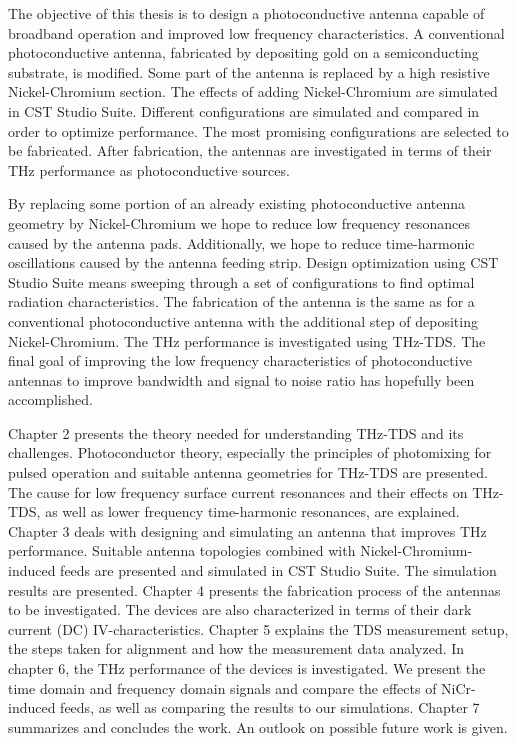 The objective of this thesis is to design a photoconductive antenna capable of broadband operation and improved low frequency characteristics. A conventional photoconductive antenna, fabricated by depositing gold on a semiconducting substrate, is modified. Some part of the antenna is replaced by a high resistive Nickel-Chromium section. The effects of adding Nickel-Chromium are simulated in CST Studio Suite. Different configurations are simulated and compared in order to optimize performance. The most promising configurations are selected to be fabricated. After fabrication, the antennas are investigated in terms of their THz performance as photoconductive sources.

By replacing some portion of an already existing photoconductive antenna geometry by Nickel-Chromium we hope to reduce low frequency resonances caused by the antenna pads. Additionally, we hope to reduce time-harmonic oscillations caused by the antenna feeding strip. Design optimization using CST Studio Suite means sweeping through a set of configurations to find optimal radiation characteristics. The fabrication of the antenna is the same as for a conventional photoconductive antenna with the additional step of depositing Nickel-Chromium. The THz performance is investigated using THz-TDS. The final goal of improving the low frequency characteristics of photoconductive antennas to improve bandwidth and signal to noise ratio has hopefully been accomplished. 

Chapter 2 presents the theory needed for understanding THz-TDS and its challenges. Photoconductor theory, especially the principles of photomixing for pulsed operation and suitable antenna geometries for THz-TDS are presented. The cause for low frequency surface current resonances and their effects on THz-TDS, as well as lower frequency time-harmonic resonances, are explained. Chapter 3 deals with designing and simulating an antenna that improves THz performance. Suitable antenna topologies combined with Nickel-Chromium-induced feeds are presented and simulated in CST Studio Suite. The simulation results are presented. Chapter 4 presents the fabrication process of the antennas to be investigated. The devices are also characterized in terms of their dark current (DC) IV-characteristics. Chapter 5 explains the TDS measurement setup, the steps taken for alignment and how the measurement data analyzed. In chapter 6, the THz performance of the devices is investigated. We present the time domain and frequency domain signals and compare the effects of NiCr-induced feeds, as well as comparing the results to our simulations. Chapter 7 summarizes and concludes the work. An outlook on possible future work is given.  